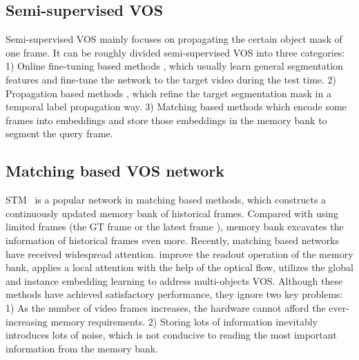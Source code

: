 \documentclass[10pt,twocolumn,letterpaper]{article}
\begin{document}
\subsection{Semi-supervised VOS}
Semi-supervised VOS mainly focuses on propagating the certain object mask of one frame. It can be roughly divided semi-supervised VOS into three categories: 1) Online fine-tuning based methods \cite{xiao2018monet, maninis2018video}, which usually learn general segmentation features and fine-tune the network to the target video during the test time. 2) Propagation based methods \cite{luiten2018premvos, chen2020state}, which refine the target segmentation mask in a temporal label propagation way. 3) Matching based methods \cite{oh2019video, seong2020kernelized, zhang2020transductive, cheng2021rethinking, mao2021joint} which encode some frames into embeddings and store those embeddings in the memory bank to segment the query frame. 
\subsection{Matching based VOS network}
STM~\cite{oh2019video} is a popular network in matching based methods, which constructs a continuously updated memory bank of historical frames. Compared with using limited frames (the GT frame \cite{hu2018videomatch} or the latest frame \cite{perazzi2017learning}), memory bank excavates the information of historical frames even more. Recently, matching based networks have received widespread attention. \cite{seong2020kernelized, lu2020video, cheng2021modular, hu2021learning} improve the readout operation of the memory bank, \cite{xie2021efficient} applies a local attention with the help of the optical flow, \cite{ge2021video} utilizes the global and instance embedding learning to address multi-objects VOS. Although these methods have achieved satisfactory performance, they ignore two key problems: 1) As the number of video frames increases, the hardware cannot afford the ever-increasing memory requirements. 2) Storing lots of information inevitably introduces lots of noise, which is not conducive to reading the most important information from the memory bank.
\end{document}
